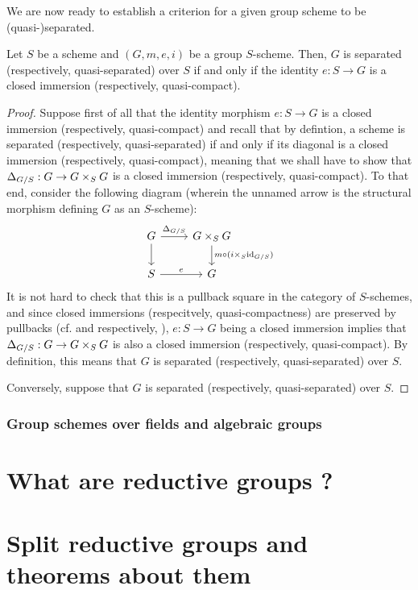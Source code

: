                 We are now ready to establish a criterion for a given group scheme to be (quasi-)separated.
                \begin{proposition} \label{prop: (quasi)_separatedness_criterion_for_group_schemes}
                    Let $S$ be a scheme and $(G, m, e, i)$ be a group $S$-scheme. Then, $G$ is separated (respectively, quasi-separated) over $S$ if and only if the identity $e: S \to G$ is a closed immersion (respectively, quasi-compact).
                \end{proposition}
                    \begin{proof}
                        Suppose first of all that the identity morphism $e: S \to G$ is a closed immersion (respectively, quasi-compact) and recall that by defintion, a scheme is separated (respectively, quasi-separated) if and only if its diagonal is a closed immersion (respectively, quasi-compact), meaning that we shall have to show that $\Delta_{G/S}: G \to G \x_S G$ is a closed immersion (respectively, quasi-compact). To that end, consider the following diagram (wherein the unnamed arrow is the structural morphism defining $G$ as an $S$-scheme):
                            $$
                                \begin{tikzcd}
                                	G & {G \x_S G} \\
                                	S & G
                                	\arrow["{\Delta_{G/S}}", from=1-1, to=1-2]
                                	\arrow["e", from=2-1, to=2-2]
                                	\arrow[from=1-1, to=2-1]
                                	\arrow["{m \circ (i \x_S \id_{G/S})}", from=1-2, to=2-2]
                                \end{tikzcd}
                            $$
                        It is not hard to check that this is a pullback square in the category of $S$-schemes, and since closed immersions (respecitvely, quasi-compactness) are preserved by pullbacks (cf. \cite[\href{https://stacks.math.columbia.edu/tag/01JY}{Tag 01JY}]{stacks} and respectively, \cite[\href{https://stacks.math.columbia.edu/tag/01K5}{Tag 01K5}]{stacks}), $e: S \to G$ being a closed immersion implies that $\Delta_{G/S}: G \to G \x_S G$ is also a closed immersion (respectively, quasi-compact). By definition, this means that $G$ is separated (respectively, quasi-separated) over $S$.
                        
                        Conversely, suppose that $G$ is separated (respectively, quasi-separated) over $S$. 
                    \end{proof}
            
            \subsubsection{Group schemes over fields and algebraic groups}
    
    \section{What are reductive groups ?}
    
    \section{Split reductive groups and theorems about them}